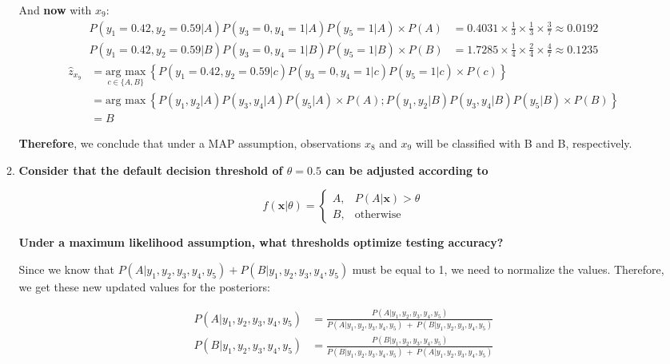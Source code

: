 \documentclass[12pt]{article}
\begin{document}
\begin{enumerate}[leftmargin=\labelsep]
\begin{enumerate}
          And \textbf{now} with $x_9$:
          $$
              \begin{aligned}
                  P(y_1 = 0.42, y_2 = 0.59 | A) P(y_3 = 0, y_4 = 1 | A) P(y_5 = 1 | A) \times P(A) & = 0.4031 \times \frac{1}{3} \times \frac{1}{3} \times \frac{3}{7} \approx 0.0192 \\
                  P(y_1 = 0.42, y_2 = 0.59 | B) P(y_3 = 0, y_4 = 1 | B) P(y_5 = 1 | B) \times P(B) & = 1.7285 \times \frac{1}{4} \times \frac{2}{4} \times \frac{4}{7} \approx 0.1235
              \end{aligned}
          $$
          $$
              \begin{aligned}
                  \hat{z}_{x_9} & = \underset{c \in \{A, B\}}{\text{arg max}} \medspace \left\{P(y_1 = 0.42, y_2 = 0.59 | c) P(y_3 = 0, y_4 = 1 | c) P(y_5 = 1 | c) \times P(c)\right\}  \\
                          & = \text{arg max} \medspace \left\{P(y_1, y_2 | A) P(y_3, y_4 | A) P(y_5 | A) \times P(A); P(y_1, y_2 | B) P(y_3, y_4 | B) P(y_5 | B) \times P(B)\right\} \\
                          & = B
              \end{aligned}
          $$

          \textbf{Therefore}, we conclude that under a MAP assumption, observations $x_8$ and $x_9$ will be classified with B and B, respectively.

          \item \textbf{Consider that the default decision threshold of $\theta = 0.5$ can be adjusted according to}

                \[
                        f(\textbf{x}|\theta)=
                    \begin{cases}
                        A,& P(A|\textbf{x}) > \theta\\
                        B,& \text{otherwise}
                    \end{cases}
                \]

                \textbf{Under a maximum likelihood assumption, what thresholds optimize testing accuracy?}

          \vskip 0.3cm
          Since we know that $P(A|y_1, y_2, y_3, y_4, y_5) + P(B|y_1, y_2, y_3, y_4, y_5)$ must be equal to 1, we need to normalize the values.
          Therefore, we get these new updated values for the posteriors:

          \begin{equation}\label{exI1-c-N}
              \begin{aligned}
                  P(A|y_1, y_2, y_3, y_4, y_5) & = \frac{P(A|y_1, y_2, y_3, y_4, y_5)}{P(A|y_1, y_2, y_3, y_4, y_5) \ + \ P(B|y_1, y_2, y_3, y_4, y_5)} \\
                  P(B|y_1, y_2, y_3, y_4, y_5) & = \frac{P(B|y_1, y_2, y_3, y_4, y_5)}{P(B|y_1, y_2, y_3, y_4, y_5) \ + \ P(A|y_1, y_2, y_3, y_4, y_5)}
              \end{aligned}
          \end{equation}


\end{enumerate}
\end{enumerate}
\end{document}
